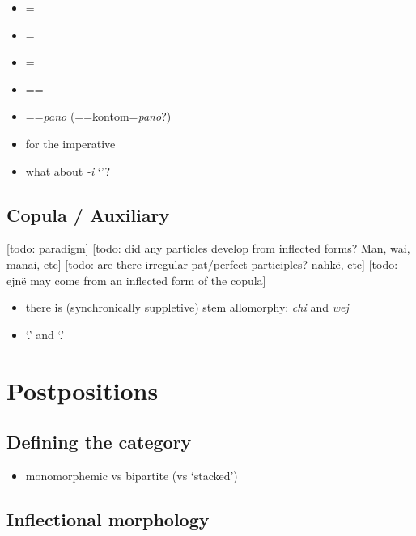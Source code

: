 \documentclass{memoir}
\begin{document}
\begin{itemize}
\tightlist
\item
  =
\item
  =
\item
  =
\item
  ==
\item
  ==\emph{pano}
  (==kontom=\emph{pano}?)
\item
   for the imperative
\item
  what about \emph{-i} `'?
\end{itemize}

\section{Copula / Auxiliary}

{[}todo: paradigm{]} {[}todo: did any particles develop from inflected
forms? Man, wai, manai, etc{]} {[}todo: are there irregular pat/perfect
participles? nahkë, etc{]} {[}todo: ejnë may come from an inflected form
of the copula{]}

\begin{itemize}
\tightlist
\item
  there is (synchronically suppletive) stem allomorphy: \emph{chi} and
  \emph{wej}
\item
   `.' and  `.'
\end{itemize}

\chapter{\texorpdfstring{Postpositions \label{postp}}{Postpositions }}

\section{Defining the category}

\begin{itemize}
\tightlist
\item
  monomorphemic vs bipartite (vs `stacked')
\end{itemize}

\section{\texorpdfstring{Inflectional morphology
\label{sec:postinfl}}{Inflectional morphology }}
\end{document}
